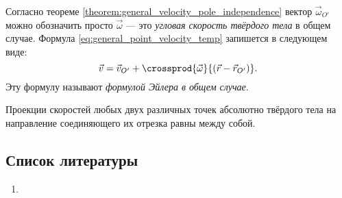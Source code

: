 Согласно теореме \ref{theorem:general_velocity_pole_independence} вектор
$\vec{\omega}_{O'}$ можно обозначить просто $\vec{\omega}$ --- это
\textit{угловая скорость твёрдого тела} в общем случае. Формула
\ref{eq:general_point_velocity_temp} запишется в следующем виде:
\begin{equation}
  \label{eq:general_euler_formula}
  \vec{v} = \vec{v}_{O'} +
    \crossprod
      {\vec{\omega}}
      {(\vec{r} - \vec{r}_{O'})}.
\end{equation}
Эту формулу называют \textit{формулой Эйлера в общем случае}.

\begin{corollary}
  Проекции скоростей любых двух различных точек абсолютно твёрдого тела на
  направление соединяющего их отрезка равны между собой.
\end{corollary}

\subsection{Список литературы}
\begin{enumerate}
  \item \cite{lectures}
\end{enumerate}

